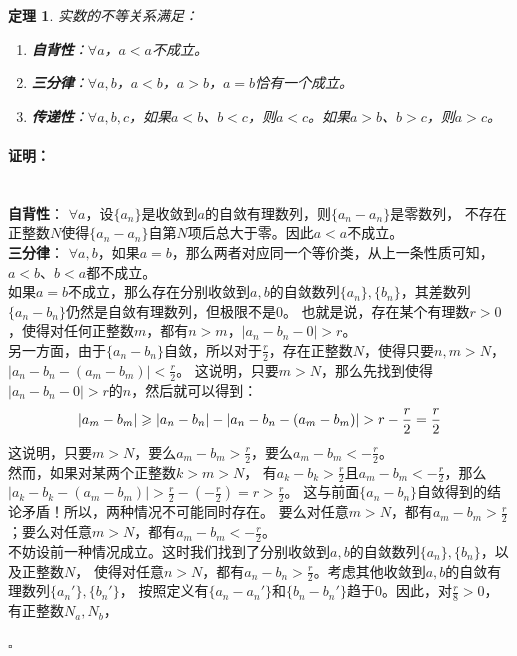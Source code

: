 \documentclass[12pt,UTF8]{ctexbook}
\newtheorem{tm}{定理}[section]
\newenvironment{proof2}{\paragraph{\textbf{证明：}}}{\hfill$\square$}
\begin{document}
\begin{appendix}
\begin{tm}\label{tm:a-1-15}
    实数的不等关系满足：
    \begin{enumerate}
        \item \textbf{自背性}：$\forall a$，$a < a$不成立。
        \item \textbf{三分律}：$\forall a, b$，$a < b$，$a > b$，$a = b$恰有一个成立。
        \item \textbf{传递性}：$\forall a, b, c$，如果$a < b$、$b < c$，则$a < c$。如果$a > b$、$b > c$，则$a > c$。
    \end{enumerate}
\end{tm}
\begin{proof2}
    \mbox{} \\
    \textbf{自背性}： $\forall a$，设$\{a_n\}$是收敛到$a$的自敛有理数列，则$\{a_n - a_n\}$是零数列，
    不存在正整数$N$使得$\{a_n - a_n\}$自第$N$项后总大于零。因此$a<a$不成立。\\
    \textbf{三分律}： $\forall a, b$，如果$a = b$，那么两者对应同一个等价类，从上一条性质可知，$a<b$、$b<a$都不成立。\\
    如果$a = b$不成立，那么存在分别收敛到$a,b$的自敛数列$\{a_n\}, \{b_n\}$，其差数列$\{a_n - b_n\}$仍然是自敛有理数列，但极限不是$0$。
    也就是说，存在某个有理数$r>0$，使得对任何正整数$m$，都有$n>m$，$|a_n - b_n - 0| > r$。\\
    另一方面，由于$\{a_n - b_n\}$自敛，所以对于$\frac{r}{2}$，存在正整数$N$，使得只要$n,m>N$，$|a_n - b_n - (a_m - b_m)| < \frac{r}{2}$。
    这说明，只要$m>N$，那么先找到使得$|a_n - b_n - 0| > r$的$n$，然后就可以得到：
    \begin{align}
        |a_m - b_m| \geqslant |a_n - b_n| - |a_n - b_n - (a_m - b_m)| > r - \frac{r}{2} = \frac{r}{2} \notag 
    \end{align}
    这说明，只要$m>N$，要么$a_m - b_m > \frac{r}{2}$，要么$a_m - b_m < -\frac{r}{2}$。\\
    然而，如果对某两个正整数$k>m>N$，
    有$a_k - b_k > \frac{r}{2}$且$a_m - b_m < -\frac{r}{2}$，那么$|a_k - b_k - (a_m - b_m)| > \frac{r}{2} - (-\frac{r}{2}) = r > \frac{r}{2}$。
    这与前面$\{a_n - b_n\}$自敛得到的结论矛盾！所以，两种情况不可能同时存在。
    要么对任意$m>N$，都有$a_m - b_m > \frac{r}{2}$；要么对任意$m>N$，都有$a_m - b_m < -\frac{r}{2}$。\\
    不妨设前一种情况成立。这时我们找到了分别收敛到$a,b$的自敛数列$\{a_n\}, \{b_n\}$，以及正整数$N$，
    使得对任意$n>N$，都有$a_n - b_n > \frac{r}{2}$。考虑其他收敛到$a,b$的自敛有理数列$\{a_n'\}, \{b_n'\}$，
    按照定义有$\{a_n - a_n'\}$和$\{b_n - b_n'\}$趋于$0$。因此，对$\frac{r}{8}>0$，有正整数$N_a,N_b$，

\end{proof2}
\end{appendix}
\end{document}
